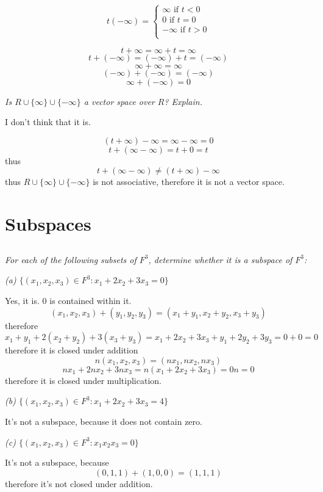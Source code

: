 \documentclass[10pt,oneside,titlepage]{book}
\begin{document}
$$
t(-\infty) =
\begin{cases}
  \infty \text{ if } t < 0 \\
  0 \text{ if } t = 0 \\
  -\infty \text{ if } t > 0 \\
\end{cases}
$$

$$t + \infty = \infty + t = \infty$$
$$t + (-\infty) = (-\infty) + t = (-\infty)$$
$$\infty + \infty = \infty$$
$$(-\infty) + (-\infty) = (-\infty)$$
$$\infty + (-\infty) = 0$$

\textit{Is $R \cup \{\infty\} \cup \{-\infty\}$ a vector space over
  $R$? Explain.}

I don't think that it is.

$$(t + \infty) - \infty = \infty - \infty = 0$$
$$t + (\infty - \infty) = t + 0 = t$$
thus
$$t + (\infty - \infty) \neq (t + \infty) - \infty$$
thus 
$R \cup \{\infty\} \cup \{-\infty\}$ is not associative, therefore it is
not a vector space.

\section{Subspaces}

\subsection{}
\textit{For each of the following subsets of $F^3$, determine whether it is a
  subspace of $F^3$:}

\textit{(a) $\{(x_1, x_2, x_3) \in F^3: x_1 + 2x_2 + 3x_3 = 0\}$}

Yes, it is. $0$ is contained within it.
$$(x_1, x_2, x_3) + (y_1, y_2, y_3) = (x_1 + y_1, x_2 + y_2, x_3 + y_3)$$
therefore
$$x_1 + y_1 + 2(x_2 + y_2) +  3(x_3 + y_3) =
x_1 + 2x_2 + 3x_3 + y_1 + 2y_2 + 3y_3 = 0+ 0 = 0$$
therefore it is closed under addition
$$n(x_1, x_2, x_3) = (nx_1, nx_2, nx_3)$$
$$nx_1 + 2nx_2 + 3nx_3 = n(x_1 + 2x_2 + 3x_3 ) = 0n = 0$$
therefore it is closed under multiplication.

\textit{(b) $\{(x_1, x_2, x_3) \in F^3: x_1 + 2x_2 + 3x_3 = 4\}$}

It's not a subspace, because it does not contain zero.


\textit{(c) $\{(x_1, x_2, x_3) \in F^3: x_1 x_2 x_3 = 0\}$}

It's not a subspace, because
$$(0, 1, 1) + (1, 0, 0) = (1, 1, 1)$$
therefore it's not closed under addition.
\end{document}
